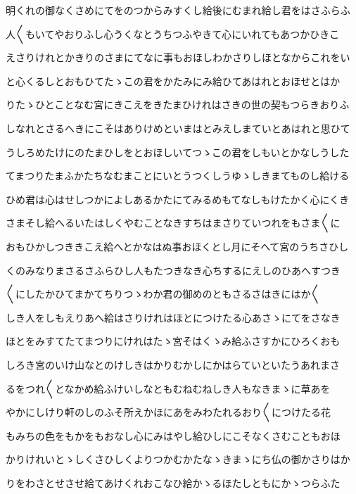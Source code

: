 \documentclass[a4paper,11pt,landscape]{ltjtarticle}
\begin{document}
\par\medskip
明くれの御なくさめにてをのつからみすくし給後にむまれ給し君をはさふらふ
\par\medskip
人〱もいてやおりふし心うくなとうちつふやきて心にいれてもあつかひきこ
\par\medskip
えさりけれとかきりのさまにてなに事もおほしわかさりしほとなからこれをい
\par\medskip
と心くるしとおもひてたゝこの君をかたみにみ給ひてあはれとおほせとはか
\par\medskip
りたゝひとことなむ宮にきこえをきたまひけれはさきの世の契もつらきおりふ
\par\medskip
しなれとさるへきにこそはありけめといまはとみえしまていとあはれと思ひて
\par\medskip
うしろめたけにのたまひしをとおほしいてつゝこの君をしもいとかなしうした
\par\medskip
てまつりたまふかたちなむまことにいとうつくしうゆゝしきまてものし給ける
\par\medskip
ひめ君は心はせしつかによしあるかたにてみるめもてなしもけたかく心にくき
\par\medskip
さまそし給へるいたはしくやむことなきすちはまさりていつれをもさま〱に
\par\medskip
おもひかしつききこえ給へとかなはぬ事おほくとし月にそへて宮のうちさひし
\par\medskip
くのみなりまさるさふらひし人もたつきなき心ちするにえしのひあへすつき
\par\medskip
〱にしたかひてまかてちりつゝわか君の御めのともさるさはきにはか〱
\par\medskip
しき人をしもえりあへ給はさりけれはほとにつけたる心あさゝにてをさなき
\par\medskip
ほとをみすてたてまつりにけれはたゝ宮そはくゝみ給ふさすかにひろくおも
\par\medskip
しろき宮のいけ山なとのけしきはかりむかしにかはらていといたうあれまさ
\par\medskip
るをつれ〱となかめ給ふけいしなともむねむねしき人もなきまゝに草あを
\par\medskip
やかにしけり軒のしのふそ所えかほにあをみわたれるおり〱につけたる花
\par\medskip
もみちの色をもかをもおなし心にみはやし給ひしにこそなくさむこともおほ
\par\medskip
かりけれいとゝしくさひしくよりつかむかたなゝきまゝにち仏の御かさりはか
\par\medskip
りをわさとせさせ給てあけくれおこなひ給かゝるほたしともにかゝつらふた
\par\medskip
\end{document}
